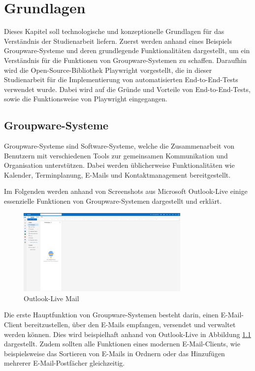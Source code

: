 \chapter{Grundlagen}

Dieses Kapitel soll technologische und konzeptionelle Grundlagen für das Verständnis der Studienarbeit liefern.
Zuerst werden anhand eines Beispiels Groupware-Systeme und deren grundlegende Funktionalitäten dargestellt, um ein Verständnis für die Funktionen von Groupware-Systemen zu schaffen.
Daraufhin wird die Open-Source-Bibliothek Playwright vorgestellt, die in dieser Studienarbeit für die Implementierung von automatisierten End-to-End-Tests verwendet wurde.
Dabei wird auf die Gründe und Vorteile von End-to-End-Tests, sowie die Funktionsweise von Playwright eingegangen.

\section{Groupware-Systeme}

Groupware-Systeme sind Software-Systeme, welche die Zusammenarbeit von Benutzern mit verschiedenen Tools zur gemeinsamen Kommunikation und Organisation unterstützen.
Dabei werden üblicherweise Funktionalitäten wie Kalender, Terminplanung, E-Mails und Kontaktmanagement bereitgestellt.

Im Folgenden werden anhand von Screenshots aus Microsoft Outlook-Live einige essenzielle Funktionen von Groupware-Systemen dargestellt und erklärt.
\begin{figure}[H]
    \centering
    \includegraphics[width=0.75\textwidth]{images/OutlookLive_Mail1.png}
    \caption{Outlook-Live Mail}
    \label{fig:outlook-live-mail}
\end{figure}
Die erste Hauptfunktion von Groupware-Systemen besteht darin, einen E-Mail-Client bereitzustellen, über den E-Mails empfangen, versendet und verwaltet werden können. Dies wird beispielhaft anhand von Outlook-Live in Abbildung \ref{fig:outlook-live-mail} dargestellt.
Zudem sollten alle Funktionen eines modernen E-Mail-Clients, wie beispielsweise das Sortieren von E-Mails in Ordnern oder das Hinzufügen mehrerer E-Mail-Postfächer gleichzeitig.


